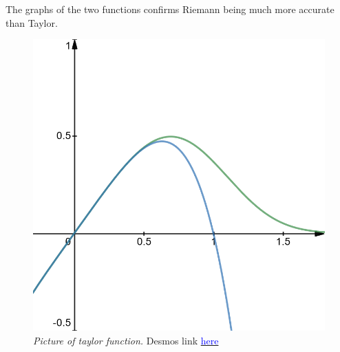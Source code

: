 \documentclass[12pt]{article}
\begin{document}
The graphs of the two functions confirms Riemann being much more accurate than Taylor.
\begin{figure}[H]
  \begin{center}
    \includegraphics[scale=.3]{taylor.png}
    \caption{\textit{Picture of taylor function.} Desmos link \href{https://www.desmos.com/calculator/zhjxfaf7nq}{\textcolor{blue}{here}}}
  \end{center}
\end{figure}
\end{document}
